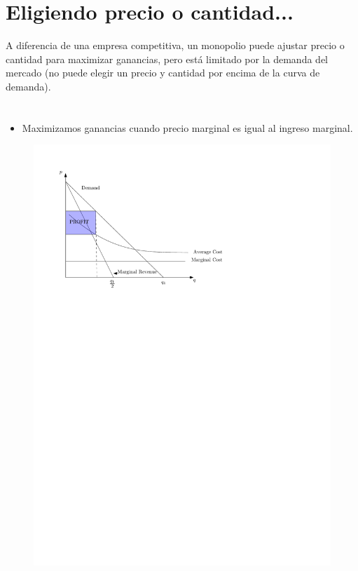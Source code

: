 \section{Eligiendo precio o cantidad...}
{A diferencia de una empresa competitiva, un monopolio puede ajustar precio o cantidad para maximizar ganancias, pero está limitado por la demanda del mercado (no puede elegir un precio y cantidad por encima de la curva de demanda).
} \newline 


\section{ }
\begin{itemize}
    \item Maximizamos ganancias cuando precio marginal es igual al ingreso marginal.
\end{itemize}

\begin{figure}[H]
    \centering
    \includegraphics[]{Clases/figs/profit} 
\end{figure}




